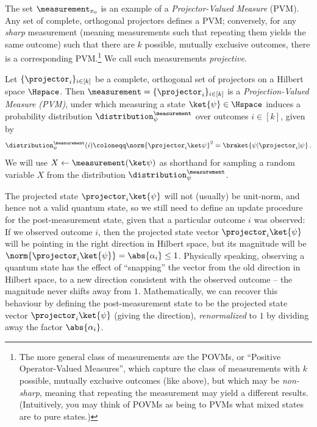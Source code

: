       The set $\measurement_{x_0}$ is an example of a \emph{Projector-Valued
        Measure} (PVM). Any set of complete, orthogonal projectors defines a
        PVM; conversely, for any \emph{sharp} measurement (meaning measurements
        such that repeating them yields the same outcome) such that there are $k$
        possible, mutually exclusive outcomes, there is a corresponding
        PVM.\footnote{
          The more general class of measurements are the POVMs, or ``Positive
          Operator-Valued Measures'', which capture the class of measurements
          with $k$ possible, mutually exclusive outcomes (like above), but
          which may be \emph{non-sharp}, meaning that repeating the measurement
          may yield a different results. 
          (Intuitively, you may think of POVMs as being to PVMs what mixed
          states are to pure states.)
        } We call such measurements \emph{projective}.

      \begin{definition}\label{def:pvm}
        Let $\{ \projector_{i} \}_{i \in [k]}$ be a complete,
          orthogonal set of projectors on a Hilbert space $\Hspace$.
          Then $\measurement = \{\projector_{i} \}_{i \in [k]}$ is a 
          \emph{Projection-Valued Measure (PVM)}, under which measuring a
          state $\ket{\psi} \in \Hspace$
          induces a probability distribution
          $\distribution_{\psi}^{\measurement}$ over outcomes 
          $i \in [k]$, given by
          \[
            \distribution_\psi^{\measurement}(i) 
            \coloneqq \norm{\projector_i \ket\psi}^2
            = \braket{\psi|\projector_i|\psi}\, .
          \]
          We will use $X \gets \measurement(\ket\psi)$
          as shorthand for sampling a random variable $X$ from the distribution
          $\distribution_\psi^{\measurement}$.
      \end{definition}

      The projected state $\projector_i \ket{\psi}$ will not (usually) be
        unit-norm, and hence not a valid quantum state, so we still need to
        define an update procedure for the post-measurement state, given that a
        particular outcome $i$ was observed: If we observed outcome $i$, 
        then the projected state vector $\projector_i \ket{\psi}$ will be
        pointing in the right direction in Hilbert space, but its magnitude will be 
        $\norm{\projector_i \ket{\psi}} = \abs{\alpha_i} \leq 1$. 
        Physically speaking, observing a quantum state has the
        effect of ``snapping'' the vector from the old direction in Hilbert
        space, to a new direction consistent with the observed outcome -- the
        magnitude never shifts away from $1$. Mathematically, we can recover this 
        behaviour by defining the post-measurement state to be the projected state vector
        $\projector_i \ket{\psi}$ (giving the direction), \emph{renormalized}
        to $1$ by dividing away the factor $\abs{\alpha_i}$.

